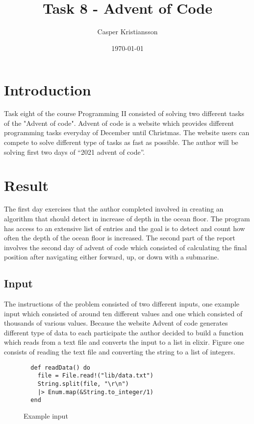 \documentclass[a4paper,11pt]{article}
\begin{document}
\title{
    \textbf{Task 8 - Advent of Code}
}
\author{Casper Kristiansson}
\date{\today}

\maketitle

\section*{Introduction}
Task eight of the course Programming II consisted of solving two different tasks of the "Advent of code". Advent of code is a website which provides different programming tasks everyday of December until Christmas. The website users can compete to solve different type of tasks as fast as possible. The author will be solving first two days of “2021 advent of code”.

\section*{Result}
The first day exercises that the author completed involved in creating an algorithm that should detect in increase of depth in the ocean floor. The program has access to an extensive list of entries and the goal is to detect and count how often the depth of the ocean floor is increased. The second part of the report involves the second day of advent of code which consisted of calculating the final position after navigating either forward, up, or down with a submarine.

\subsection*{Input}
The instructions of the problem consisted of two different inputs, one example input which consisted of around ten different values and one which consisted of thousands of various values. Because the website Advent of code generates different type of data to each participate the author decided to build a function which reads from a text file and converts the input to a list in elixir. Figure one consists of reading the text file and converting the string to a list of integers.

\begin{figure}[H]
\begin{verbatim}
  def readData() do
    file = File.read!("lib/data.txt")
    String.split(file, "\r\n")
    |> Enum.map(&String.to_integer/1)
  end
\end{verbatim}
\caption{Example input}
\label{Figure:1}
\end{figure}
\end{document}
